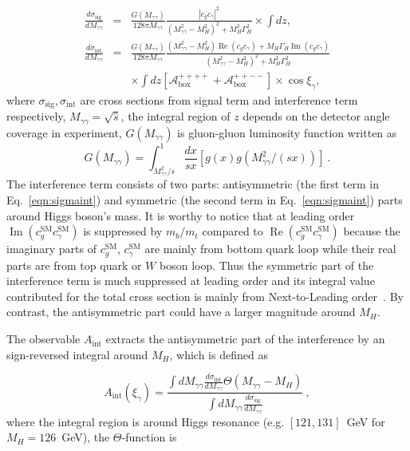 \documentclass[twocolumn,
prd,amssymb,amsmath,preprintnumbers,
floatfix,aps,nofootinbib]{revtex4-1}
\newcommand{\beq}{\begin{equation}}
\newcommand{\eeq}{\end{equation}}
\newcommand{\bea}{\begin{eqnarray}}
\newcommand{\eea}{\end{eqnarray}}
\def\oRe{\operatorname{Re}}
\def\oIm{\operatorname{Im}}
\begin{document}
\bea
\frac{d\sigma_{\text{sig}}}{dM_{\gamma\gamma}}
&=&\frac{G(M_{\gamma\gamma})}{128\pi M_{\gamma\gamma}}
\frac{ |c_g c_\gamma|^2 }
{(M^2_{\gamma\gamma}-M^2_H)^2+M^2_H\Gamma^2_H}\times \int dz,
\label{eqn:sigmasig}
 \\
\frac{d\sigma_{\text{int}}}{dM_{\gamma\gamma}}
&=&\frac{G(M_{\gamma\gamma})}{128\pi M_{\gamma\gamma}}
\frac{(M^2_{\gamma\gamma}-M^2_H)\oRe\left(c_g c_\gamma \right)
+M_H\Gamma_H \oIm\left(c_g c_\gamma \right)
}
{(M^2_{\gamma\gamma}-M^2_H)^2+M^2_H\Gamma^2_H}
\nonumber\\
&&\times\int dz
[\mathcal{A}_{\text{box}}^{++++}+\mathcal{A}_{\text{box}}^{++--}]\times\cos\xi_\gamma,
\label{eqn:sigmaint}
\eea
where $\sigma_{\text{sig}}, \sigma_{\text{int}}$ are cross sections from signal term and interference term
respectively, $M_{\gamma\gamma}=\sqrt{\hat{s}}$, the integral region of $z$ depends on the detector angle coverage in experiment,
$G(M_{\gamma\gamma})$ is gluon-gluon luminosity function written as
\beq
G(M_{\gamma\gamma})=\int^1_{M^2_{\gamma\gamma}/s}\frac{dx}{sx}[g(x)g(M^2_{\gamma\gamma}/(sx))]~.
\eeq
The interference term consists of two parts: antisymmetric (the first term in Eq.~\eqref{eqn:sigmaint}) and symmetric (the second term in Eq.~\eqref{eqn:sigmaint}) parts around
Higgs boson's mass.
It is worthy to notice that at leading order
 $\oIm\left(c^{\text{SM}}_g c^{\text{SM}}_\gamma \right)$
is suppressed by $m_b/m_t$ compared to $\oRe\left(c^{\text{SM}}_g c^{\text{SM}}_\gamma \right )$
because the imaginary parts of $c^{\text{SM}}_g$, $c^{\text{SM}}_\gamma$ are mainly
 from bottom quark loop while their real parts are from
top quark or $W$ boson loop.
Thus the symmetric part of the interference term is much suppressed at leading order
and its integral value contributed for the total cross section is mainly from Next-to-Leading order~\cite{Dicus:1987fk,Campbell:2017rke}.
By contrast, the antisymmetric part could have a larger magnitude around $M_H$.

The observable $A_{\text{int}}$
 extracts the
antisymmetric part of the interference
by an sign-reversed integral around $M_H$, which is defined as

\beq
A_{\text{int}}(\xi_\gamma)=\frac{\int dM_{\gamma\gamma}
\frac{d\sigma_{\text{int}}}{dM_{\gamma\gamma}}
\Theta(M_{\gamma\gamma}-M_H)}
{\int dM_{\gamma\gamma}\frac{d\sigma_{\text{sig}}%
}{dM_{\gamma\gamma}}
 }~,
\label{eqn:aint_definition}
\eeq
where the integral region is around Higgs resonance
(e.g. $[121,131]$~GeV for $M_H=126$~GeV),
 the $\Theta$-function is
\end{document}
